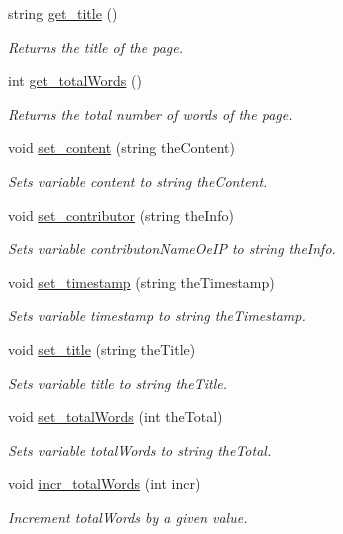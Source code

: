 \begin{DoxyCompactItemize}
string \hyperlink{class_page_info_a0985d632ae64c913fe976bedccaf5d31}{get\+\_\+title} ()
\begin{DoxyCompactList}\small\item\em Returns the title of the page. \end{DoxyCompactList}\item 
int \hyperlink{class_page_info_a40938f3d2f1c81079abcbe8051143d53}{get\+\_\+total\+Words} ()
\begin{DoxyCompactList}\small\item\em Returns the total number of words of the page. \end{DoxyCompactList}\item 
void \hyperlink{class_page_info_afaf6005be3e5fa629619038a96fbd1af}{set\+\_\+content} (string the\+Content)
\begin{DoxyCompactList}\small\item\em Sets variable content to string the\+Content. \end{DoxyCompactList}\item 
void \hyperlink{class_page_info_afb03f9cd31ec6e6f500393cd5c7e1037}{set\+\_\+contributor} (string the\+Info)
\begin{DoxyCompactList}\small\item\em Sets variable contributon\+Name\+Oe\+I\+P to string the\+Info. \end{DoxyCompactList}\item 
void \hyperlink{class_page_info_ad8f8aada94adc772c9739f5dcb3223a7}{set\+\_\+timestamp} (string the\+Timestamp)
\begin{DoxyCompactList}\small\item\em Sets variable timestamp to string the\+Timestamp. \end{DoxyCompactList}\item 
void \hyperlink{class_page_info_a0808f61697bbeca2d717d9b55b233ae1}{set\+\_\+title} (string the\+Title)
\begin{DoxyCompactList}\small\item\em Sets variable title to string the\+Title. \end{DoxyCompactList}\item 
void \hyperlink{class_page_info_adcd293f9d6bdc291f7f28663e7151c45}{set\+\_\+total\+Words} (int the\+Total)
\begin{DoxyCompactList}\small\item\em Sets variable total\+Words to string the\+Total. \end{DoxyCompactList}\item 
void \hyperlink{class_page_info_a43de865e72ac2fc61f124e2acee9da4d}{incr\+\_\+total\+Words} (int incr)
\begin{DoxyCompactList}\small\item\em Increment total\+Words by a given value. \end{DoxyCompactList}\end{DoxyCompactItemize}


